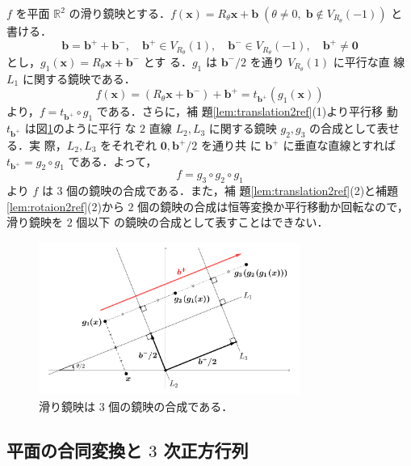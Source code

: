 \documentclass[11pt, uplatex, dvipdfmx, titlepage]{jsarticle}
\makeatletter
\renewenvironment{proof}[1][\proofname]{\par
  \pushQED{\qed}%
  \normalfont \topsep6\p@\@plus6\p@\relax
  \trivlist
  \item[\hskip\labelsep
         \bfseries
    {#1}]\ignorespaces
}{%
  \popQED\endtrivlist\@endpefalse
}
\theoremstyle{definition}
\renewcommand{\proofname}{\textbf{証明}}
\makeatother
\begin{document}
\begin{proof}
  $f$ を平面 $\mathbb{R}^2$
  の滑り鏡映とする．$f(\bm{x}) = R_{\theta}\bm{x} + \bm{b} \; (\theta
  \neq 0, \; \bm{b} \notin V_{R_{\theta}}(-1))$ と書ける．
  \[
    \bm{b} = \bm{b}^{+} + \bm{b}^{-}, \quad \bm{b}^{+} \in
    V_{R_{\theta}}(1), \quad \bm{b}^{-} \in V_{R_{\theta}}(-1),
    \quad \bm{b}^{+} \neq \bm{0}
  \]
  とし，$g_1(\bm{x}) = R_{\theta} \bm{x} + \bm{b}^{-}$ とす
  る．$g_1$ は $\bm{b}^{-}/2$ を通り $V_{R_{\theta}}(1)$ に平行な直
  線 $L_1$ に関する鏡映である．
  \[
    f(\bm{x}) = \left( R_{\theta}\bm{x} + \bm{b}^{-}\right) +
    \bm{b}^{+} = t_{\bm{b}^{+}}\left( g_1(\bm{x})\right)
  \]
  より，$f=t_{\bm{b}^{+}}\circ g_1$ である．さらに，補
  題\ref{lem:translation2ref}(1)より平行移
  動 $t_{\bm{b}^{+}}$ は図\ref{fig:glide2ref}のように平行
  な $2$ 直線 $L_2, L_3$ に関する鏡映 $g_2, g_3$ の合成として表せる．実
  際，$L_2, L_3$ をそれぞれ $\bm{0}, \bm{b}^{+}/2$ を通り共
  に $\bm{b}^{+}$ に垂直な直線とすれば $t_{\bm{b}^{+}} = g_2 \circ
  g_1$ である．よって，
  \[
    f = g_3 \circ g_2 \circ g_1
  \]
  より $f$ は $3$ 個の鏡映の合成である．また，補
  題\ref{lem:translation2ref}(2)と補題\ref{lem:rotaion2ref}(2)から $2$
  個の鏡映の合成は恒等変換か平行移動か回転なので，滑り鏡映を $2$ 個以下
  の鏡映の合成として表すことはできない．
  \begin{figure}[h]
    \centering
    \includegraphics[height=5cm]{pictures/glide2ref.pdf}
    \caption{滑り鏡映は $3$ 個の鏡映の合成である．}
    \label{fig:glide2ref}
  \end{figure}
\end{proof}



\subsection{平面の合同変換と $3$ 次正方行列}
\end{document}
